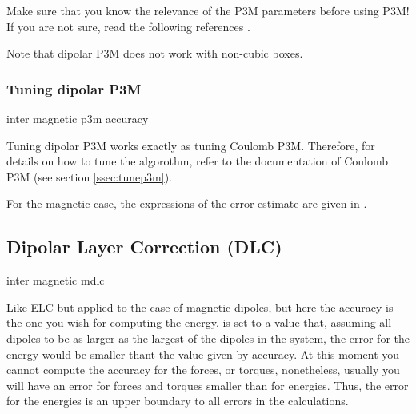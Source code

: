 Make sure that you know the relevance of the P3M parameters before
using P3M! If you are not sure, read the following references
\cite{ewald21, hockney88, kolafa92, deserno98, deserno98a, deserno00,
  deserno00a}.

Note that dipolar P3M does not work with non-cubic boxes.

\subsubsection{Tuning dipolar P3M}
\begin{essyntax}
  inter magnetic  p3m 
  accuracy \\
     
  \begin{features}
  \end{features}
\end{essyntax}

Tuning dipolar P3M works exactly as tuning Coulomb P3M.  Therefore,
for details on how to tune the algorothm, refer to the documentation
of Coulomb P3M (see section \vref{ssec:tunep3m}).

For the magnetic case, the expressions of the error estimate are given
in \cite{cerda08a}.

\subsection{Dipolar Layer Correction (DLC)}

\begin{essyntax}
  inter magnetic mdlc  
  \begin{features}
  \end{features}
\end{essyntax}

Like ELC but applied to the case of magnetic dipoles, but here the
accuracy is the one you wish for computing the energy.
 is set to a value that, assuming all dipoles to be as
larger as the largest of the dipoles in the system, the error for the
energy would be smaller thant the value given by accuracy. At this
moment you cannot compute the accuracy for the forces, or torques,
nonetheless, usually you will have an error for forces and torques
smaller than for energies. Thus, the error for the energies is an
upper boundary to all errors in the calculations.

